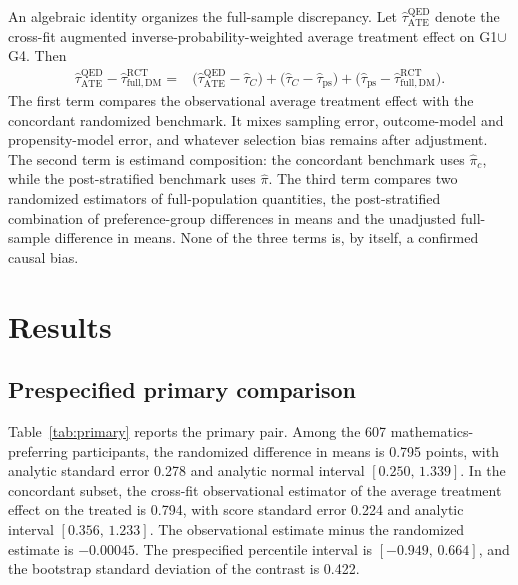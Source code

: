 \documentclass[11pt]{article}
\theoremstyle{remark}
\begin{document}
An algebraic identity organizes the full-sample discrepancy. Let $\widehat\tau^{\mathrm{QED}}_{\mathrm{ATE}}$ denote the cross-fit augmented inverse-probability-weighted average treatment effect on G1$\cup$G4. Then
\begin{equation}
\begin{aligned}
\widehat\tau^{\mathrm{QED}}_{\mathrm{ATE}}
-
\widehat\tau^{\mathrm{RCT}}_{\mathrm{full,DM}}
={}&
\bigl(\widehat\tau^{\mathrm{QED}}_{\mathrm{ATE}}-\widehat\tau_C\bigr)
+
\bigl(\widehat\tau_C-\widehat\tau_{\mathrm{ps}}\bigr)
+
\bigl(\widehat\tau_{\mathrm{ps}}
-
\widehat\tau^{\mathrm{RCT}}_{\mathrm{full,DM}}\bigr).
\end{aligned}
\label{eq:decomposition}
\end{equation}
The first term compares the observational average treatment effect with the concordant randomized benchmark. It mixes sampling error, outcome-model and propensity-model error, and whatever selection bias remains after adjustment. The second term is estimand composition: the concordant benchmark uses $\widehat\pi_c$, while the post-stratified benchmark uses $\widehat\pi$. The third term compares two randomized estimators of full-population quantities, the post-stratified combination of preference-group differences in means and the unadjusted full-sample difference in means. None of the three terms is, by itself, a confirmed causal bias.

\section{Results}
\label{sec:results}

\subsection{Prespecified primary comparison}

Table~\ref{tab:primary} reports the primary pair. Among the 607 mathematics-preferring participants, the randomized difference in means is 0.795 points, with analytic standard error 0.278 and analytic normal interval $[0.250,\,1.339]$. In the concordant subset, the cross-fit observational estimator of the average treatment effect on the treated is 0.794, with score standard error 0.224 and analytic interval $[0.356,\,1.233]$. The observational estimate minus the randomized estimate is $-0.00045$. The prespecified percentile interval is $[-0.949,\,0.664]$, and the bootstrap standard deviation of the contrast is 0.422.
\end{document}
